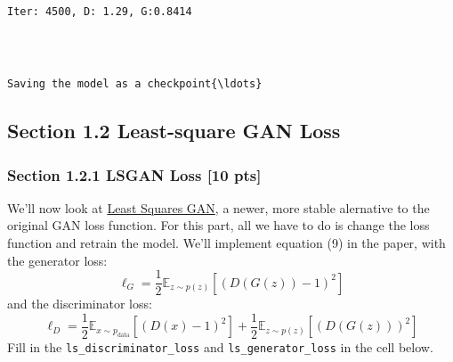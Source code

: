 \documentclass[11pt]{article}
\begin{document}
    \begin{center}
    \end{center}
    { \hspace*{\fill} \\}
    
    \begin{Verbatim}[commandchars=\\\{\}]

Iter: 4500, D: 1.29, G:0.8414
    \end{Verbatim}

    \begin{center}
    \end{center}
    { \hspace*{\fill} \\}
    
    \begin{Verbatim}[commandchars=\\\{\}]

Saving the model as a checkpoint{\ldots}
    \end{Verbatim}

    \hypertarget{section-1.2-least-square-gan-loss}{%
\subsection{Section 1.2 Least-square GAN
Loss}\label{section-1.2-least-square-gan-loss}}

\hypertarget{section-1.2.1-lsgan-loss-10-pts}{%
\subsubsection{Section 1.2.1 LSGAN Loss {[}10
pts{]}}\label{section-1.2.1-lsgan-loss-10-pts}}

We'll now look at \href{https://arxiv.org/abs/1611.04076}{Least Squares
GAN}, a newer, more stable alernative to the original GAN loss function.
For this part, all we have to do is change the loss function and retrain
the model. We'll implement equation (9) in the paper, with the generator
loss:
\[\ell_G  =  \frac{1}{2}\mathbb{E}_{z \sim p(z)}\left[\left(D(G(z))-1\right)^2\right]\]
and the discriminator loss:
\[ \ell_D = \frac{1}{2}\mathbb{E}_{x \sim p_\text{data}}\left[\left(D(x)-1\right)^2\right] + \frac{1}{2}\mathbb{E}_{z \sim p(z)}\left[ \left(D(G(z))\right)^2\right]\]
Fill in the \texttt{ls\_discriminator\_loss} and
\texttt{ls\_generator\_loss} in the cell below.
\end{document}
